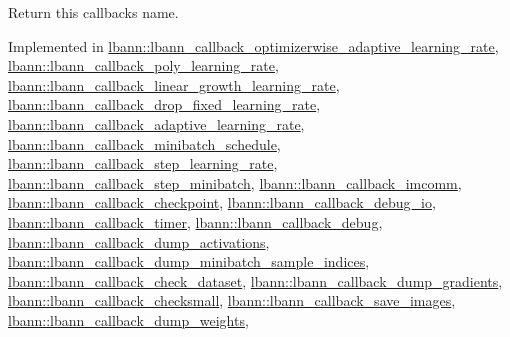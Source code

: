 Return this callback\textquotesingle{}s name. 

Implemented in \hyperlink{classlbann_1_1lbann__callback__optimizerwise__adaptive__learning__rate_a31120725bd22d1ce783a6edba9c5fb5d}{lbann\+::lbann\+\_\+callback\+\_\+optimizerwise\+\_\+adaptive\+\_\+learning\+\_\+rate}, \hyperlink{classlbann_1_1lbann__callback__poly__learning__rate_a755be6dc66e1c403edc69db11592a4ea}{lbann\+::lbann\+\_\+callback\+\_\+poly\+\_\+learning\+\_\+rate}, \hyperlink{classlbann_1_1lbann__callback__linear__growth__learning__rate_a6080051bd4de75dc1ca3d927414d2455}{lbann\+::lbann\+\_\+callback\+\_\+linear\+\_\+growth\+\_\+learning\+\_\+rate}, \hyperlink{classlbann_1_1lbann__callback__drop__fixed__learning__rate_a715d550fb9ec99e32861f91299669c35}{lbann\+::lbann\+\_\+callback\+\_\+drop\+\_\+fixed\+\_\+learning\+\_\+rate}, \hyperlink{classlbann_1_1lbann__callback__adaptive__learning__rate_ab7292639822b95f3907d1aaf88410b1c}{lbann\+::lbann\+\_\+callback\+\_\+adaptive\+\_\+learning\+\_\+rate}, \hyperlink{classlbann_1_1lbann__callback__minibatch__schedule_a2bb62cf45d2f7417cddcf79843ce3e2b}{lbann\+::lbann\+\_\+callback\+\_\+minibatch\+\_\+schedule}, \hyperlink{classlbann_1_1lbann__callback__step__learning__rate_a0332449e3d03aac46e0562cede85a5ed}{lbann\+::lbann\+\_\+callback\+\_\+step\+\_\+learning\+\_\+rate}, \hyperlink{classlbann_1_1lbann__callback__step__minibatch_a2e07fa5a590d68b1b71059d9275ee12a}{lbann\+::lbann\+\_\+callback\+\_\+step\+\_\+minibatch}, \hyperlink{classlbann_1_1lbann__callback__imcomm_af058602425005a1d198df40b7845e16e}{lbann\+::lbann\+\_\+callback\+\_\+imcomm}, \hyperlink{classlbann_1_1lbann__callback__checkpoint_aa1afa81c9638bf76fb6ecfe91d07a88e}{lbann\+::lbann\+\_\+callback\+\_\+checkpoint}, \hyperlink{classlbann_1_1lbann__callback__debug__io_ae624010712365242688be8e55a566c62}{lbann\+::lbann\+\_\+callback\+\_\+debug\+\_\+io}, \hyperlink{classlbann_1_1lbann__callback__timer_a32a3b87744ee0fcac931e8e69358ece9}{lbann\+::lbann\+\_\+callback\+\_\+timer}, \hyperlink{classlbann_1_1lbann__callback__debug_ae9e892671f4959cfc915e1662afd6d60}{lbann\+::lbann\+\_\+callback\+\_\+debug}, \hyperlink{classlbann_1_1lbann__callback__dump__activations_adc6a741a2ef667a5969ddbb8ec159163}{lbann\+::lbann\+\_\+callback\+\_\+dump\+\_\+activations}, \hyperlink{classlbann_1_1lbann__callback__dump__minibatch__sample__indices_a8d2174d894176a7ab5324f5d7e6faad2}{lbann\+::lbann\+\_\+callback\+\_\+dump\+\_\+minibatch\+\_\+sample\+\_\+indices}, \hyperlink{classlbann_1_1lbann__callback__check__dataset_a150273f878be4d4bf0cdcaf0ba52aef2}{lbann\+::lbann\+\_\+callback\+\_\+check\+\_\+dataset}, \hyperlink{classlbann_1_1lbann__callback__dump__gradients_ae66a46b4835233c0a08c1fcc2fc9710d}{lbann\+::lbann\+\_\+callback\+\_\+dump\+\_\+gradients}, \hyperlink{classlbann_1_1lbann__callback__checksmall_acbdd897ecbe5a27b59db15ae7662e0f9}{lbann\+::lbann\+\_\+callback\+\_\+checksmall}, \hyperlink{classlbann_1_1lbann__callback__save__images_ae3e0f20308b83a3a1b2fe0ba1acbd072}{lbann\+::lbann\+\_\+callback\+\_\+save\+\_\+images}, \hyperlink{classlbann_1_1lbann__callback__dump__weights_ae6c0fee627651edaff778b1fd4b0e0c4}{lbann\+::lbann\+\_\+callback\+\_\+dump\+\_\+weights}, 